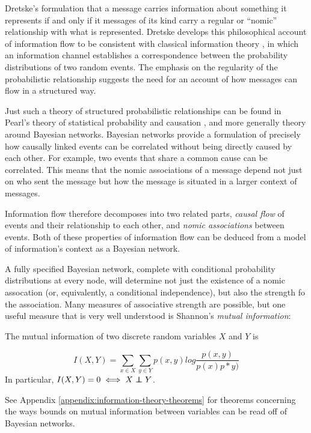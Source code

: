 \documentclass[../thesis.tex]{subfiles}
\begin{document}
Dretske's \cite{dretske1981knowledge} formulation
that a message carries information about something it represents
if and only if it messages of its kind carry a regular or ``nomic''
relationship with what is represented.
Dretske develops this philosophical account of information flow
to be consistent with classical information theory
\cite{shannon1948mathematical}, in which an information channel
establishes a correspondence between the probability distributions
of two random events.
The emphasis on the regularity of the probabilistic relationship
suggests the need for an account of how messages can flow
in a structured way.

Just such a theory of structured probabilistic relationships
can be found in Pearl's theory of statistical probability and causation 
\cite{pearl1988probabilistic}, and more generally theory
around Bayesian networks.
Bayesian networks provide a formulation of precisely how
causally linked events can be correlated without being
directly caused by each other. For example, two events that
share a common cause can be correlated.
This means that the nomic associations of a message depend
not just on who sent the message but how the message
is situated in a larger context of messages.

Information flow therefore decomposes into two related parts,
\emph{causal flow} of events and their relationship to each
other, and \emph{nomic associations} between events.
Both of these properties of information flow can be
deduced from a model of information's context as a
Bayesian network.

A fully specified Bayesian network, complete with
conditional probability distributions at every
node, will determine not just the existence of
a nomic assocation (or, equivalently, a conditional
independence), but also the strength fo the association.
Many measures of associative strength are possible,
but one useful measure that is very well understood is
Shannon's \emph{mutual information}:

\begin{dfn}
  The mutual information of two discrete random variables
  $X$ and $Y$ is

  $$I(X,Y) = \sum_{x \in X} \sum_{y \in Y} p(x,y) log \frac{p(x,y)}{p(x)p*y)}$$
  In particular, $I(X,Y) = 0 \iff X \independent Y$.
\end{dfn}

See Appendix \ref{appendix:information-theory-theorems} for
theorems concerning the ways bounds on mutual information
between variables can be read off of Bayesian networks.
\end{document}
